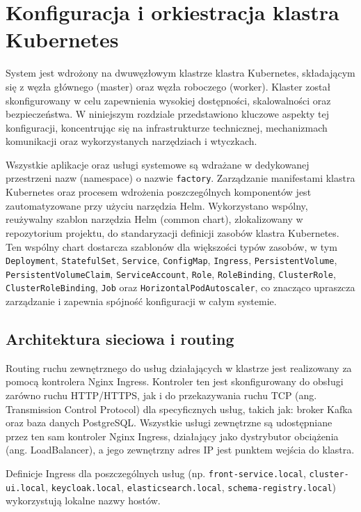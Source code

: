 \section{Konfiguracja i orkiestracja klastra Kubernetes}
\label{chap:konfiguracja_kubernetes}

System jest wdrożony na dwuwęzłowym klastrze klastra Kubernetes, składającym się z węzła głównego (master) oraz węzła roboczego (worker). Klaster został skonfigurowany w celu zapewnienia wysokiej dostępności, skalowalności oraz bezpieczeństwa. W niniejszym rozdziale przedstawiono kluczowe aspekty tej konfiguracji, koncentrując się na infrastrukturze technicznej, mechanizmach komunikacji oraz wykorzystanych narzędziach i wtyczkach.

Wszystkie aplikacje oraz usługi systemowe są wdrażane w dedykowanej przestrzeni nazw (namespace) o nazwie \texttt{factory}. Zarządzanie manifestami klastra Kubernetes oraz procesem wdrożenia poszczególnych komponentów jest zautomatyzowane przy użyciu narzędzia Helm. Wykorzystano wspólny, reużywalny szablon narzędzia Helm (common chart), zlokalizowany w repozytorium projektu, do standaryzacji definicji zasobów klastra Kubernetes. Ten wspólny chart dostarcza szablonów dla większości typów zasobów, w tym \texttt{Deployment}, \texttt{StatefulSet}, \texttt{Service}, \texttt{ConfigMap}, \texttt{Ingress}, \texttt{PersistentVolume}, \texttt{PersistentVolumeClaim}, \texttt{ServiceAccount}, \texttt{Role}, \texttt{RoleBinding}, \texttt{ClusterRole}, \\ \texttt{ClusterRoleBinding}, \texttt{Job} oraz \texttt{HorizontalPodAutoscaler}, co znacząco upraszcza zarządzanie i zapewnia spójność konfiguracji w całym systemie.

\subsection{Architektura sieciowa i routing}

Routing ruchu zewnętrznego do usług działających w klastrze jest realizowany za pomocą kontrolera Nginx Ingress. Kontroler ten jest skonfigurowany do obsługi zarówno ruchu HTTP/HTTPS, jak i do przekazywania ruchu TCP (ang. Transmission Control Protocol) dla specyficznych usług, takich jak: broker Kafka oraz baza danych PostgreSQL. Wszystkie usługi zewnętrzne są udostępniane przez ten sam kontroler Nginx Ingress, działający jako dystrybutor obciążenia (ang. LoadBalancer), a jego zewnętrzny adres IP jest punktem wejścia do klastra.

Definicje Ingress dla poszczególnych usług (np. \texttt{front-service.local}, \texttt{cluster-ui.local}, \texttt{keycloak.local}, \texttt{elasticsearch.local}, \texttt{schema-registry.local}) wykorzystują lokalne nazwy hostów.

